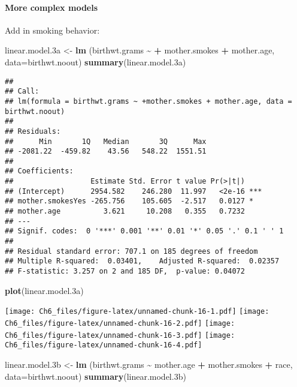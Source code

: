 \documentclass[
]{article}
\newenvironment{Shaded}{\begin{snugshade}}{\end{snugshade}}
\newcommand{\AttributeTok}[1]{\textcolor[rgb]{0.13,0.29,0.53}{#1}}
\newcommand{\FloatTok}[1]{\textcolor[rgb]{0.00,0.00,0.81}{#1}}
\newcommand{\FunctionTok}[1]{\textcolor[rgb]{0.13,0.29,0.53}{\textbf{#1}}}
\newcommand{\NormalTok}[1]{#1}
\newcommand{\OtherTok}[1]{\textcolor[rgb]{0.56,0.35,0.01}{#1}}
\newcommand{\SpecialCharTok}[1]{\textcolor[rgb]{0.81,0.36,0.00}{\textbf{#1}}}
\begin{document}
\paragraph{More complex models}\label{more-complex-models}

Add in smoking behavior:

\begin{Shaded}
\begin{Highlighting}[]
\NormalTok{linear.model}\FloatTok{.3}\NormalTok{a }\OtherTok{\textless{}{-}} \FunctionTok{lm}\NormalTok{ (birthwt.grams }\SpecialCharTok{\textasciitilde{}} \SpecialCharTok{+}\NormalTok{ mother.smokes }\SpecialCharTok{+}\NormalTok{ mother.age, }\AttributeTok{data=}\NormalTok{birthwt.noout)}
\FunctionTok{summary}\NormalTok{(linear.model}\FloatTok{.3}\NormalTok{a)}
\end{Highlighting}
\end{Shaded}

\begin{verbatim}
## 
## Call:
## lm(formula = birthwt.grams ~ +mother.smokes + mother.age, data = birthwt.noout)
## 
## Residuals:
##      Min       1Q   Median       3Q      Max 
## -2081.22  -459.82    43.56   548.22  1551.51 
## 
## Coefficients:
##                  Estimate Std. Error t value Pr(>|t|)    
## (Intercept)      2954.582    246.280  11.997   <2e-16 ***
## mother.smokesYes -265.756    105.605  -2.517   0.0127 *  
## mother.age          3.621     10.208   0.355   0.7232    
## ---
## Signif. codes:  0 '***' 0.001 '**' 0.01 '*' 0.05 '.' 0.1 ' ' 1
## 
## Residual standard error: 707.1 on 185 degrees of freedom
## Multiple R-squared:  0.03401,    Adjusted R-squared:  0.02357 
## F-statistic: 3.257 on 2 and 185 DF,  p-value: 0.04072
\end{verbatim}

\begin{Shaded}
\begin{Highlighting}[]
\FunctionTok{plot}\NormalTok{(linear.model}\FloatTok{.3}\NormalTok{a)}
\end{Highlighting}
\end{Shaded}

\texttt{[image: Ch6\_files/figure-latex/unnamed-chunk-16-1.pdf]}
\texttt{[image: Ch6\_files/figure-latex/unnamed-chunk-16-2.pdf]}
\texttt{[image: Ch6\_files/figure-latex/unnamed-chunk-16-3.pdf]}
\texttt{[image: Ch6\_files/figure-latex/unnamed-chunk-16-4.pdf]}

\begin{Shaded}
\begin{Highlighting}[]
\NormalTok{linear.model}\FloatTok{.3}\NormalTok{b }\OtherTok{\textless{}{-}} \FunctionTok{lm}\NormalTok{ (birthwt.grams }\SpecialCharTok{\textasciitilde{}}\NormalTok{ mother.age }\SpecialCharTok{+}\NormalTok{ mother.smokes }\SpecialCharTok{+}\NormalTok{ race, }\AttributeTok{data=}\NormalTok{birthwt.noout)}
\FunctionTok{summary}\NormalTok{(linear.model}\FloatTok{.3}\NormalTok{b)}
\end{Highlighting}
\end{Shaded}
\end{document}
